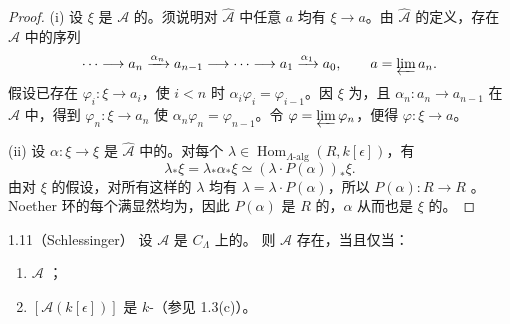 \begin{proof}
(i) 设 $\xi$ 是 $\mathcal A$ 的。须说明对 $\widehat{\mathcal A}$ 中任意 $a$ 均有 $\xi\to a$。由 $\widehat{\mathcal A}$ 的定义，存在 $\mathcal A$ 中的序列
\[\cdots\longrightarrow a_n\xrightarrow{\alpha_n}a_{n-1}\longrightarrow\cdots
\longrightarrow a_1\xrightarrow{\alpha_1}a_0,\qquad a=\varprojlim a_n.\]
假设已存在 $\varphi_i:\xi\to a_i$，使 $i<n$ 时 $\alpha_i\varphi_i=\varphi_{i-1}$。因 $\xi$ 为，且 $\alpha_n:a_n\to a_{n-1}$ 在 $\mathcal A$ 中，得到 $\varphi_n:\xi\to a_n$ 使 $\alpha_n\varphi_n=\varphi_{n-1}$。令 $\varphi=\varprojlim\varphi_n$，便得 $\varphi:\xi\to a$。

(ii) 设 $\alpha:\xi\to\xi$ 是 $\widehat{\mathcal A}$ 中的。对每个 $\lambda\in\operatorname{Hom}_{\Lambda\text{-alg}}(R,k[\epsilon])$，有
\[\lambda_*\xi=\lambda_*\alpha_*\xi\simeq(\lambda\cdot P(\alpha))_*\xi.\]
由对 $\xi$ 的假设，对所有这样的 $\lambda$ 均有 $\lambda=\lambda\cdot P(\alpha)$，所以 $P(\alpha):R\to R$ 。Noether 环的每个满显然均为，因此 $P(\alpha)$ 是 $R$ 的，$\alpha$ 从而也是 $\xi$ 的。
\end{proof}
\begin{SGAresult}{}{1.11（Schlessinger）}
设 $\mathcal A$ 是 $C_\Lambda$ 上的。
则 $\mathcal A$ 存在，当且仅当：
\begin{enumerate}
\item[(i)] $\mathcal A$ ；
\item[(ii)] $[\mathcal A(k[\epsilon])]$ 是 $k$-（参见 1.3(c)）。
\end{enumerate}
\end{SGAresult}
